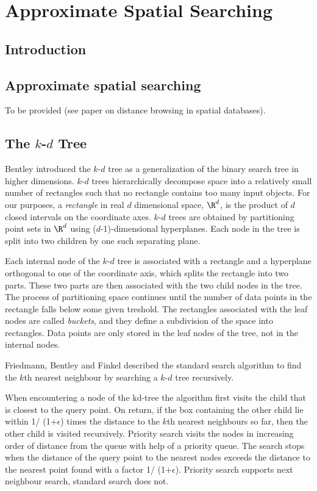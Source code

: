 \chapter{Approximate Spatial Searching}

\section{Introduction}

\section{Approximate spatial searching}

To be provided (see paper on distance browsing in spatial databases). 

\section{The $k$-$d$ Tree}

Bentley \cite{b-mbstu-75} introduced the $k$-$d$ tree as a generalization of the binary
search tree in higher dimensions. $k$-$d$ trees hierarchically decompose space into a 
relatively small number of rectangles such that no rectangle contains too many input objects. 
For our purposes, a {\it rectangle} in real $d$ dimensional space, $\R^d$, is the product of $d$ closed 
intervals on the coordinate axes.
$k$-$d$ trees are obtained by partitioning point sets in $\R^d$ using ($d$-1)-dimensional hyperplanes. 
Each node in the tree is split into two children by one such separating plane.

Each internal node of the $k$-$d$ tree is associated with a rectangle and a hyperplane orthogonal to
one of the coordinate axis, which splits the rectangle into two parts. These two parts are then associated
with the two child nodes in the tree. The process of partitioning space continues until the number of data 
points in the rectangle falls below some given treshold. The rectangles associated with the leaf nodes
are called {\it buckets}, and they define a subdivision of the space into rectangles.
Data points are only stored in the leaf nodes of the tree, not in the internal nodes.

Friedmann, Bentley and Finkel \cite{fbf-afbml-77} described the standard
search algorithm to find the $k$th nearest neighbour by searching a $k$-$d$ tree recursively.

When encountering a node of the kd-tree the algorithm first visits the child that is closest 
to the query point. On return, if the box containing  the other child lie within 
1/ (1+$\epsilon$) times the distance to the $k$th nearest neighbours so far, then 
the other child is visited recursively.
Priority search \cite{???} visits the nodes in increasing order of distance from 
the queue with help of a priority queue. 
The search stops when the distance of the query point to the nearest nodes 
exceeds the distance to the nearest point found with a factor 1/ (1+$\epsilon$).
Priority search supports next neighbour search, standard search does not.

